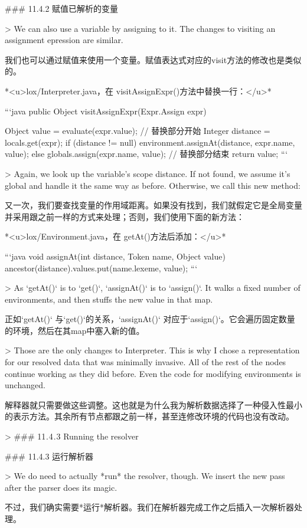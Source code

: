 \documentclass[cn,11pt,chinese]{elegantbook}
\begin{document}
{{{{{{{{{{{{{{### 11.4.2 赋值已解析的变量

> We can also use a variable by assigning to it. The changes to visiting an assignment epression are similar.

我们也可以通过赋值来使用一个变量。赋值表达式对应的visit方法的修改也是类似的。

*<u>lox/Interpreter.java，在 visitAssignExpr()方法中替换一行：</u>*

```java
  public Object visitAssignExpr(Expr.Assign expr) {
    Object value = evaluate(expr.value);  
    // 替换部分开始
    Integer distance = locals.get(expr);
    if (distance != null) {
      environment.assignAt(distance, expr.name, value);
    } else {
      globals.assign(expr.name, value);
    }
    // 替换部分结束
    return value;
```

> Again, we look up the variable’s scope distance. If not found, we assume it’s global and handle it the same way as before. Otherwise, we call this new method:

又一次，我们要查找变量的作用域距离。如果没有找到，我们就假定它是全局变量并采用跟之前一样的方式来处理；否则，我们使用下面的新方法：

*<u>lox/Environment.java，在 getAt()方法后添加：</u>*

```java
  void assignAt(int distance, Token name, Object value) {
    ancestor(distance).values.put(name.lexeme, value);
  }
```

> As `getAt()` is to `get()`, `assignAt()` is to `assign()`. It walks a fixed number of environments, and then stuffs the new value in that map.

正如`getAt()` 与`get()`的关系，`assignAt()` 对应于`assign()`。它会遍历固定数量的环境，然后在其map中塞入新的值。

> Those are the only changes to Interpreter. This is why I chose a representation for our resolved data that was minimally invasive. All of the rest of the nodes continue working as they did before. Even the code for modifying environments is unchanged.

解释器就只需要做这些调整。这也就是为什么我为解析数据选择了一种侵入性最小的表示方法。其余所有节点都跟之前一样，甚至连修改环境的代码也没有改动。

> ### 11 . 4 . 3 Running the resolver

### 11.4.3 运行解析器

> We do need to actually *run* the resolver, though. We insert the new pass after the parser does its magic.

不过，我们确实需要*运行*解析器。我们在解析器完成工作之后插入一次解析器处理。

}}}}}}}}}}}}}}}
\end{document}
